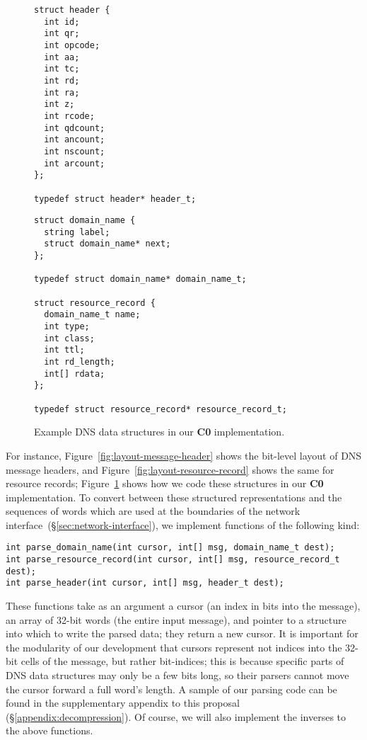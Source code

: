 \documentclass{article}
\newcommand\Lang[1]{{\sffamily\bfseries{#1}}}
\begin{document}
\begin{figure}
  \begin{lstlisting}[frame=single]
struct header {
  int id;
  int qr;
  int opcode;
  int aa;
  int tc;
  int rd;
  int ra;
  int z;
  int rcode;
  int qdcount;
  int ancount;
  int nscount;
  int arcount;
};

typedef struct header* header_t;
  \end{lstlisting}

  \begin{lstlisting}[frame=single]
struct domain_name {
  string label;
  struct domain_name* next;
};

typedef struct domain_name* domain_name_t;

struct resource_record {
  domain_name_t name;
  int type;
  int class;
  int ttl;
  int rd_length;
  int[] rdata;
};

typedef struct resource_record* resource_record_t;
  \end{lstlisting}
  \caption{Example DNS data structures in our \Lang{C0} implementation.}\label{fig:c0-data-structures}
\end{figure}

For instance, Figure~\ref{fig:layout-message-header} shows the
bit-level layout of DNS message headers, and
Figure~\ref{fig:layout-resource-record} shows the same for resource
records; Figure~\ref{fig:c0-data-structures} shows how we code these
structures in our \Lang{C0} implementation. To convert between these
structured representations and the sequences of words which are used
at the boundaries of the network
interface~(\S\ref{sec:network-interface}), we implement functions of
the following kind:

\begin{lstlisting}
int parse_domain_name(int cursor, int[] msg, domain_name_t dest);
int parse_resource_record(int cursor, int[] msg, resource_record_t dest);
int parse_header(int cursor, int[] msg, header_t dest);
\end{lstlisting}

These functions take as an argument a cursor (an index in bits into
the message), an array of 32-bit words (the entire input message), and
pointer to a structure into which to write the parsed data; they
return a new cursor. It is important for the modularity of our
development that cursors represent not indices into the 32-bit cells
of the message, but rather bit-indices; this is because specific parts
of DNS data structures may only be a few bits long, so their parsers
cannot move the cursor forward a full word's length.
%
A sample of our parsing code can be found in the supplementary
appendix to this proposal (\S\ref{appendix:decompression}). Of
course, we will also implement the inverses to the above functions.
\end{document}
